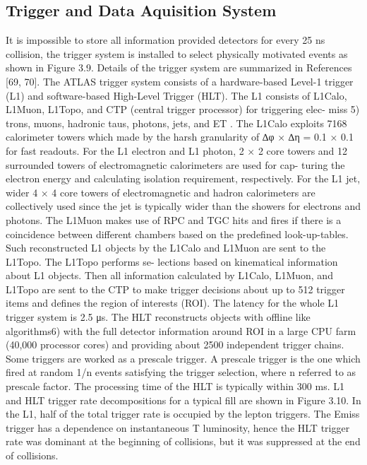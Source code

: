 \subsection{Trigger and Data Aquisition System}
It is impossible to store all information provided detectors for every 25 ns collision, the trigger system is installed to select physically motivated events as shown in Figure 3.9. Details of the trigger system are summarized in References [69, 70]. The ATLAS trigger system consists of a hardware-based Level-1 trigger (L1) and software-based High-Level Trigger (HLT).
The L1 consists of L1Calo, L1Muon, L1Topo, and CTP (central trigger processor) for triggering elec- miss 5)
trons, muons, hadronic taus, photons, jets, and ET . The L1Calo exploits 7168 calorimeter towers which made by the harsh granularity of ∆φ × ∆η = 0.1 × 0.1 for fast readouts. For the L1 electron and L1 photon, 2 × 2 core towers and 12 surrounded towers of electromagnetic calorimeters are used for cap- turing the electron energy and calculating isolation requirement, respectively. For the L1 jet, wider 4 × 4 core towers of electromagnetic and hadron calorimeters are collectively used since the jet is typically wider than the showers for electrons and photons. The L1Muon makes use of RPC and TGC hits and fires if there is a coincidence between different chambers based on the predefined look-up-tables. Such
reconstructed L1 objects by the L1Calo and L1Muon are sent to the L1Topo. The L1Topo performs se- lections based on kinematical information about L1 objects. Then all information calculated by L1Calo, L1Muon, and L1Topo are sent to the CTP to make trigger decisions about up to 512 trigger items and defines the region of interests (ROI). The latency for the whole L1 trigger system is 2.5 μs.
The HLT reconstructs objects with offline like algorithms6) with the full detector information around ROI in a large CPU farm (40,000 processor cores) and providing about 2500 independent trigger chains. Some triggers are worked as a prescale trigger. A prescale trigger is the one which fired at random 1/n events satisfying the trigger selection, where n referred to as prescale factor. The processing time of the HLT is typically within 300 ms.
L1 and HLT trigger rate decompositions for a typical fill are shown in Figure 3.10. In the L1, half of the
total trigger rate is occupied by the lepton triggers. The Emiss trigger has a dependence on instantaneous T
luminosity, hence the HLT trigger rate was dominant at the beginning of collisions, but it was suppressed at the end of collisions.